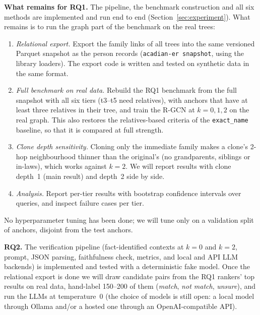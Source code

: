 \textbf{What remains for RQ1.}
The pipeline, the benchmark construction and all six methods are implemented and run end to end (Section~\ref{sec:experiment}). What remains is to run the graph part of the benchmark on the real trees:
\begin{enumerate}
\item \emph{Relational export.} Export the family links of all trees into the same versioned Parquet snapshot as the person records (\texttt{acadian-er snapshot}, using the library loaders). The export code is written and tested on synthetic data in the same format.
\item \emph{Full benchmark on real data.} Rebuild the RQ1 benchmark from the full snapshot with all six tiers (t3--t5 need relatives), with anchors that have at least three relatives in their tree, and train the R-GCN at $k=0,1,2$ on the real graph. This also restores the relatives-based criteria of the \texttt{exact\_name} baseline, so that it is compared at full strength.
\item \emph{Clone depth sensitivity.} Cloning only the immediate family makes a clone's 2-hop neighbourhood thinner than the original's (no grandparents, siblings or in-laws), which works against $k=2$. We will report results with clone depth~1 (main result) and depth~2 side by side.
\item \emph{Analysis.} Report per-tier results with bootstrap confidence intervals over queries, and inspect failure cases per tier.
\end{enumerate}
No hyperparameter tuning has been done; we will tune only on a validation split of anchors, disjoint from the test anchors.

\textbf{RQ2.}
The verification pipeline (fact-identified contexts at $k=0$ and $k=2$, prompt, JSON parsing, faithfulness check, metrics, and local and API LLM backends) is implemented and tested with a deterministic fake model. Once the relational export is done we will draw candidate pairs from the RQ1 rankers' top results on real data, hand-label 150--200 of them (\textit{match}, \textit{not match}, \textit{unsure}), and run the LLMs at temperature~0 (the choice of models is still open: a local model through Ollama and/or a hosted one through an OpenAI-compatible API).

